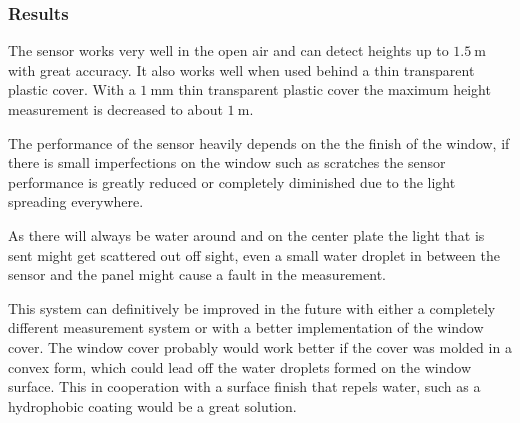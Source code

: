 \subsubsection{Results}
The sensor works very well in the open air and can detect heights up to $1.5~\textrm{m}$ with great accuracy. It also works well when used behind a thin transparent plastic cover. With a $1~\textrm{mm}$ thin transparent plastic cover the maximum height measurement is decreased to about $1~\textrm{m}$. 

The performance of the sensor heavily depends on the the finish of the window, if there is small imperfections on the window such as scratches the sensor performance is greatly reduced or completely diminished due to the light spreading everywhere.

As there will always be water around and on the center plate the light that is sent might get scattered out off sight, even a small water droplet in between the sensor and the panel might cause a fault in the measurement.  

This system can definitively be improved in the future with either a completely different measurement system or with a better implementation of the window cover. The window cover probably would work better if the cover was molded in a convex form, which could lead off the water droplets formed on the window surface. This in cooperation with a surface finish that repels water, such as a hydrophobic coating would be a great solution. 

